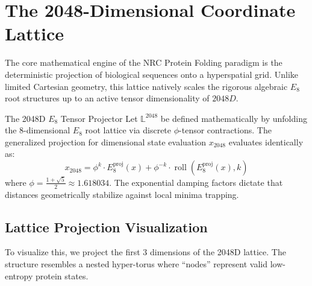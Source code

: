 \section{The 2048-Dimensional Coordinate Lattice}

The core mathematical engine of the NRC Protein Folding paradigm is the deterministic projection of biological sequences onto a hyperspatial grid. Unlike limited Cartesian geometry, this lattice natively scales the rigorous algebraic $E_8$ root structures up to an active tensor dimensionality of $2048D$. 

\begin{definition}{The 2048D $E_8$ Tensor Projector}
	Let $\mathbb{L}^{2048}$ be defined mathematically by unfolding the 8-dimensional $E_8$ root lattice via discrete $\phi$-tensor contractions. The generalized projection for dimensional state evaluation $x_{2048}$ evaluates identically as:
	\begin{equation}
	    x_{2048} = \phi^k \cdot E_8^{\text{proj}}(x) + \phi^{-k} \cdot \operatorname{roll}(E_8^{\text{proj}}(x), k)
	\end{equation}
	where $\phi = \frac{1 + \sqrt{5}}{2} \approx 1.618034$. The exponential damping factors dictate that distances geometrically stabilize against local minima trapping. 
\end{definition}

\subsection{Lattice Projection Visualization}
To visualize this, we project the first 3 dimensions of the 2048D lattice. The structure resembles a nested hyper-torus where ``nodes'' represent valid low-entropy protein states.

